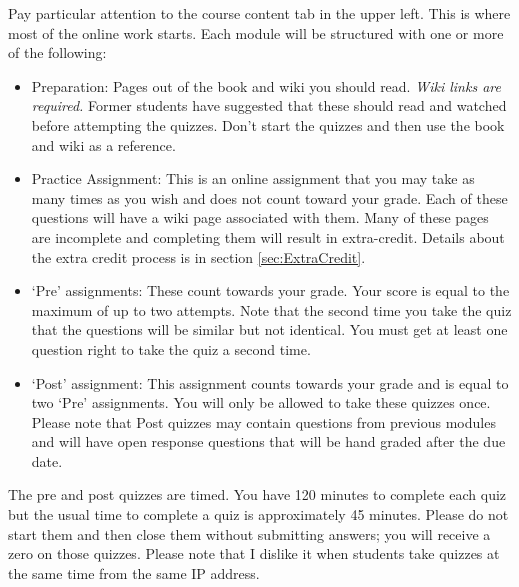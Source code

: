 \documentclass[letterpaper,10pt]{article}
\begin{document}
Pay particular attention to the course content tab in the upper
left. This is where most of the online work starts.  Each module will
be structured with one or more of the following:

\begin{itemize}
\item Preparation: Pages out of the book and wiki you should read.
  \emph{Wiki links are required.}  Former students have suggested that these should read and watched before attempting the quizzes.  Don't start the quizzes and then use the book and wiki as a reference.
  
  \item Practice Assignment: This is an online assignment that you may take as many times as you wish and does not count toward your grade. Each of these questions will have a wiki page associated with them. Many of these pages are incomplete and completing them will result in extra-credit. Details about the extra credit process is in section \ref{sec:ExtraCredit}.

\item `Pre' assignments: These count towards your grade.
  Your score is equal to the maximum of up to two attempts. Note that the second time you take the quiz that the questions will be similar but not identical. You must get at least one question right to take the quiz a second time.

\item `Post' assignment: This assignment counts
  towards your grade and is equal to two `Pre' assignments.  You will
  only be allowed to take these quizzes once.  Please note that Post quizzes may contain questions from previous modules and will have open response questions that will be hand graded after the due date.

 
\end{itemize}

 The pre and post quizzes are timed. You have 120 minutes to complete each quiz but the usual time to complete a quiz is approximately 45 minutes.  Please do not start them and
  then close them without submitting answers; you will receive a zero on those quizzes.  Please note that I dislike it when students take
  quizzes at the same time from the same IP address.

\end{document}
